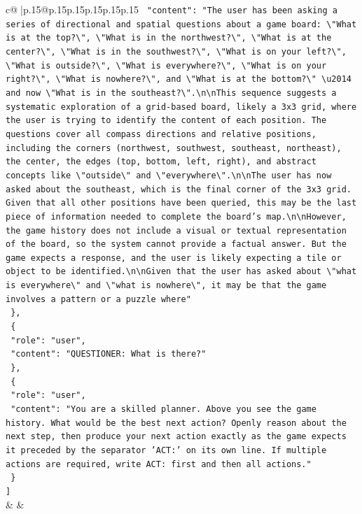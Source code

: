 \documentclass{article}
\begin{document}
{\begin{supertabular}{c@{$\;$}|p{.15\linewidth}@{}p{.15\linewidth}p{.15\linewidth}p{.15\linewidth}p{.15\linewidth}p{.15\linewidth}}
{{{\texttt{    "content": "The user has been asking a series of directional and spatial questions about a game board: \textbackslash{}"What is at the top?\textbackslash{}", \textbackslash{}"What is in the northwest?\textbackslash{}", \textbackslash{}"What is at the center?\textbackslash{}", \textbackslash{}"What is in the southwest?\textbackslash{}", \textbackslash{}"What is on your left?\textbackslash{}", \textbackslash{}"What is outside?\textbackslash{}", \textbackslash{}"What is everywhere?\textbackslash{}", \textbackslash{}"What is on your right?\textbackslash{}", \textbackslash{}"What is nowhere?\textbackslash{}", and \textbackslash{}"What is at the bottom?\textbackslash{}" \textbackslash{}u2014 and now \textbackslash{}"What is in the southeast?\textbackslash{}".\textbackslash{}n\textbackslash{}nThis sequence suggests a systematic exploration of a grid{-}based board, likely a 3x3 grid, where the user is trying to identify the content of each position. The questions cover all compass directions and relative positions, including the corners (northwest, southwest, southeast, northeast), the center, the edges (top, bottom, left, right), and abstract concepts like \textbackslash{}"outside\textbackslash{}" and \textbackslash{}"everywhere\textbackslash{}".\textbackslash{}n\textbackslash{}nThe user has now asked about the southeast, which is the final corner of the 3x3 grid. Given that all other positions have been queried, this may be the last piece of information needed to complete the board's map.\textbackslash{}n\textbackslash{}nHowever, the game history does not include a visual or textual representation of the board, so the system cannot provide a factual answer. But the game expects a response, and the user is likely expecting a tile or object to be identified.\textbackslash{}n\textbackslash{}nGiven that the user has asked about \textbackslash{}"what is everywhere\textbackslash{}" and \textbackslash{}"what is nowhere\textbackslash{}", it may be that the game involves a pattern or a puzzle where"} \\
\texttt{  \},} \\
\texttt{  \{} \\
\texttt{    "role": "user",} \\
\texttt{    "content": "QUESTIONER: What is there?"} \\
\texttt{  \},} \\
\texttt{  \{} \\
\texttt{    "role": "user",} \\
\texttt{    "content": "You are a skilled planner. Above you see the game history. What would be the best next action? Openly reason about the next step, then produce your next action exactly as the game expects it preceded by the separator 'ACT:' on its own line. If multiple actions are required, write ACT: first and then all actions."} \\
\texttt{  \}} \\
\texttt{{]}} \\
            }
        }
    }
    & & \\ \\


\end{supertabular}}
\end{document}

